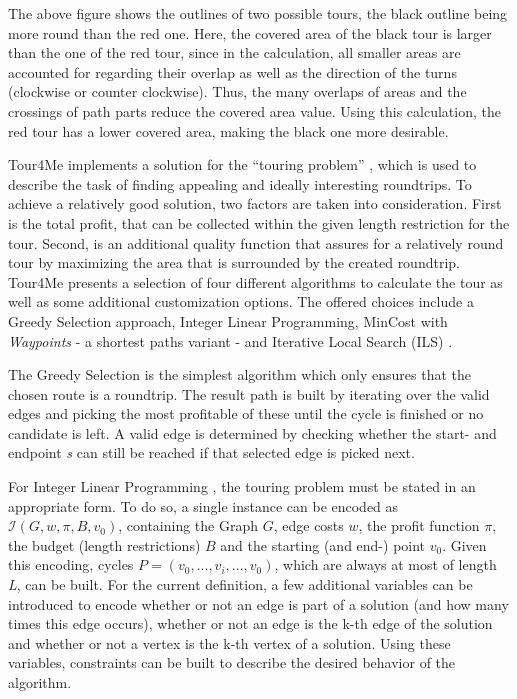 The above figure shows the outlines of two possible tours, the black outline being more round than the red one. 
Here, the covered area of the black tour is larger than the one of the red tour, since in the calculation, all smaller areas are accounted for regarding their overlap as well as the direction of the turns (clockwise or counter clockwise).
Thus, the many overlaps of areas and the crossings of path parts reduce the covered area value.
Using this calculation, the red tour has a lower covered area, making the black one more desirable.



Tour4Me implements a solution for the \enquote{touring problem} , which is used to describe the task of finding appealing and ideally interesting roundtrips.
To achieve a relatively good solution, two factors are taken into consideration.
First is the total profit, that can be collected within the given length restriction for the tour.
Second, is an additional quality function that assures for a relatively round tour by maximizing the area that is surrounded by the created roundtrip.
Tour4Me presents a selection of four different algorithms to calculate the tour as well as some additional customization options.
The offered choices include a Greedy Selection approach, Integer Linear Programming, MinCost with \textit{Waypoints} - a shortest paths variant - and Iterative Local Search (ILS) \cite{buchin_tour4me_2022}. 

The Greedy Selection \cite{buchin_tour4me_2022, wayahdi_greedy_2021} is the simplest algorithm which only ensures that the chosen route is a roundtrip.
The result path is built by iterating over the valid edges and picking the most profitable of these until the cycle is finished or no candidate is left.
A valid edge is determined by checking whether the start- and endpoint \textit{s} can still be reached if that selected edge is picked next.


For Integer Linear Programming \cite{buchin_tour4me_2022, graver_foundations_1975}, the touring problem must be stated in an appropriate form.
To do so, a single instance can be encoded as $\mathcal{I}(G, w, \pi, B, v_0)$, containing the Graph $G$, edge costs $w$, the profit function $\pi$, the budget (length restrictions) $B$ and the starting (and end-) point $v_0$.
Given this encoding, cycles $P=(v_0,...,v_i,...,v_0)$, which are always at most of length \textit{L}, can be built.
For the current definition, a few additional variables can be introduced to encode whether or not an edge is part of a solution (and how many times this edge occurs), whether or not an edge is the k-th edge of the solution and whether or not a vertex is the k-th vertex of a solution. 
Using these variables, constraints can be built to describe the desired behavior of the algorithm.

